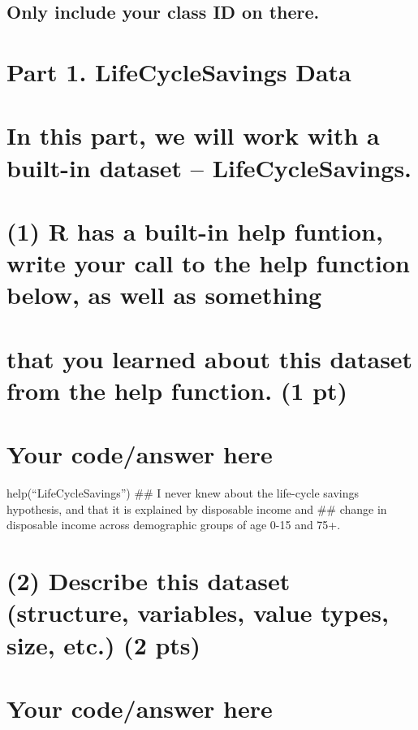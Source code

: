 \documentclass[]{article}
\begin{document}
\subsection{Only include your class ID on
there.}\label{only-include-your-class-id-on-there.}

\section{Part 1. LifeCycleSavings
Data}\label{part-1.-lifecyclesavings-data}

\section{In this part, we will work with a built-in dataset --
LifeCycleSavings.}\label{in-this-part-we-will-work-with-a-built-in-dataset-lifecyclesavings.}

\section{(1) R has a built-in help funtion, write your call to the help
function below, as well as
something}\label{r-has-a-built-in-help-funtion-write-your-call-to-the-help-function-below-as-well-as-something}

\section{that you learned about this dataset from the help function. (1
pt)}\label{that-you-learned-about-this-dataset-from-the-help-function.-1-pt}

\section{Your code/answer here}\label{your-codeanswer-here}

help(``LifeCycleSavings'') \#\# I never knew about the life-cycle
savings hypothesis, and that it is explained by disposable income and
\#\# change in disposable income across demographic groups of age 0-15
and 75+.

\section{(2) Describe this dataset (structure, variables, value types,
size, etc.) (2
pts)}\label{describe-this-dataset-structure-variables-value-types-size-etc.-2-pts}

\section{Your code/answer here}\label{your-codeanswer-here-1}
\end{document}
